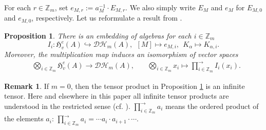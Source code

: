 \documentclass[reqno,12pt]{amsart}
\numberwithin{equation}{section}
\theoremstyle{plain}
\newtheorem{proposition}[theorem]{\bf Proposition}
\theoremstyle{definition}
\newtheorem{remark}[theorem]{\bf Remark}
\begin{document}
For each $r\in\mathbb{Z}_m$, set $e_{M,r}:=a_M^{-1}\cdot E_{M,r}$. We also simply write $E_M$ and $e_M$ for $E_{M,0}$ and $e_{M,0}$, respectively. Let us reformulate a result from \cite[Prop. 4.4]{ChenD}.
\begin{proposition}\label{CD}
There is an embedding of algebras for each $i\in\mathbb{Z}_m$
\begin{equation}\label{emb} I_i:\mathfrak{H}_{v}^e(A)\hookrightarrow\mathcal {D}\mathcal {H}_m(A),~~[M]\mapsto e_{M,i},~~K_\alpha\mapsto K_{\alpha,i}. \end{equation} Moreover, the multiplication map induces an isomorphism of vector spaces
\begin{equation}\label{ji}\begin{aligned}
&\bigotimes\limits_{i\in\mathbb{Z}_m}
\mathfrak{H}_{v}^e(A)\longrightarrow \mathcal {D}\mathcal {H}_m(A),\quad
&\bigotimes\limits_{i\in\mathbb{Z}_m}x_i\longmapsto \prod\limits_{i\in\mathbb{Z}_m}^{\rightarrow}I_i(x_i).
\end{aligned}\end{equation}
\end{proposition}

\begin{remark}
If $m=0$, then the tensor product in Proposition \ref{CD} is an infinite tensor. Here and elsewhere in this paper all infinite tensor products are understood in the restricted sense (cf. \cite[Sec. 3.2]{Kapranov}). $\prod\limits_{i\in\mathbb{Z}_m}^{\rightarrow}a_i$ means the ordered product of the elements $a_i$: $\prod\limits_{i\in\mathbb{Z}_m}^{\rightarrow}a_i=
\cdots a_i\cdot a_{i+1}\cdot\cdots$.
\end{remark}
\end{document}

